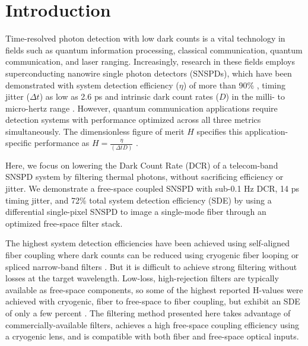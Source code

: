 \documentclass[11pt]{caltech_thesis} %
\begin{document}
\hypertarget{introduction}{%
\section{Introduction}\label{introduction}}

Time-resolved photon detection with low dark counts is a vital
technology in fields such as quantum information processing, classical
communication, quantum communication, and laser ranging. Increasingly,
research in these fields employs superconducting nanowire single photon
detectors (SNSPDs), which have been demonstrated with system detection
efficiency (\(\eta\)) of more than 90\% \autocite{Reddy2020}, timing
jitter (\(\Delta t\)) as low as 2.6 ps \autocite{Korzh2020} and
intrinsic dark count rates (\(D\)) in the milli- to micro-hertz range
\autocite{Hochberg2019}. However, quantum communication applications
require detection systems with performance optimized across all three
metrics simultaneously. The dimensionless figure of merit \(H\)
specifies this application-specific performance as
\(H = \frac{\eta}{(\Delta t D)}\) \autocite{Hadfield2009}.

Here, we focus on lowering the Dark Count Rate (DCR) of a telecom-band
SNSPD system by filtering thermal photons, without sacrificing
efficiency or jitter. We demonstrate a free-space coupled SNSPD with
sub-0.1 Hz DCR, 14 ps timing jitter, and 72\% total system detection
efficiency (SDE) by using a differential single-pixel SNSPD
\autocite{Colangelo2021} to image a single-mode fiber through an
optimized free-space filter stack.

The highest system detection efficiencies have been achieved using
self-aligned fiber coupling where dark counts can be reduced using
cryogenic fiber looping \autocite{Cohen2015} or spliced narrow-band
filters \autocite{Boaron2018secure}. But it is difficult to achieve
strong filtering without losses at the target wavelength. Low-loss,
high-rejection filters are typically available as free-space components,
so some of the highest reported H-values were achieved with cryogenic,
fiber to free-space to fiber coupling, but exhibit an SDE of only a few
percent \autocite{Shibata2015}. The filtering method presented here
takes advantage of commercially-available filters, achieves a high
free-space coupling efficiency using a cryogenic lens, and is compatible
with both fiber and free-space optical inputs.
\end{document}
